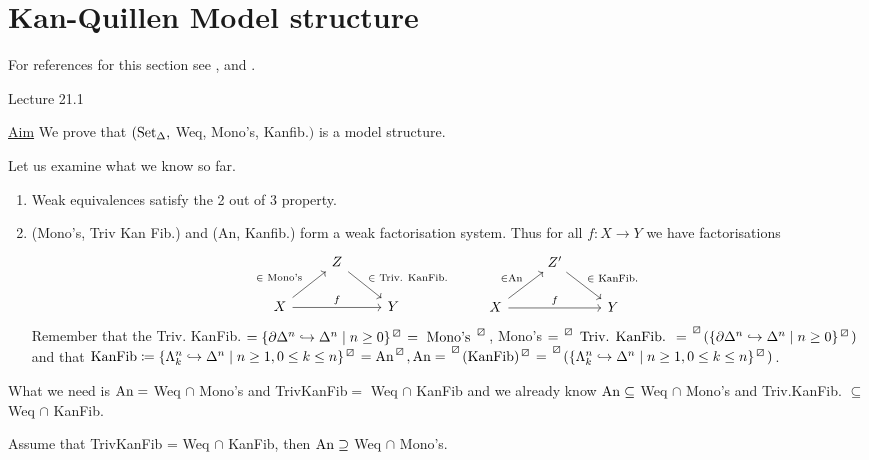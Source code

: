 \section{Kan-Quillen Model structure}

For references for this section see \cite[Section 2.2]{Cisinski_2019}, \cite[Section I.9]{GoerSimp1999} and \cite{Model_category_Hovey}.

Lecture 21.1

\underline{Aim} We prove that $(\operatorname{Set}_{\Delta},$ Weq, Mono's, Kanfib.$)$ is a model structure.

Let us examine what we know so far.
\begin{enumerate}
    \item 
    Weak equivalences satisfy the 2 out of 3 property.
    \item 
    (Mono's, Triv Kan Fib.) and (An, Kanfib.) form a weak factorisation system.
    Thus for all $f\colon X \to Y$ we have factorisations
    \[
    \begin{tikzcd}
        &
        Z
        \ar[rd, "\in \text{ Triv. KanFib. }"]
        &
        \\
        X
        \ar[ru, " \in \text{ Mono's }"]
        \ar[rr, "f"]
        &&
        Y
    \end{tikzcd}
    \qquad
    \begin{tikzcd}
        &
        Z'
        \ar[rd, "\in \text{ KanFib. }"]
        &
        \\
        X
        \ar[ru, " \in \An "]
        \ar[rr, "f"]
        &&
        Y
    \end{tikzcd}
    \]
    Remember that the Triv. KanFib. $= \{ \partial\Delta^n \hookrightarrow \Delta^n \mid n \geq 0 \}^{\lift{}}=\text{ Mono's }^{\lift{}}$, Mono's $=\prescript{\lift{}}{}{\text{ Triv. KanFib. }} = \prescript{\lift{}}{}{(\{ \partial\Delta^n \hookrightarrow \Delta^n \mid n \geq 0 \}^{\lift{}})}$ and that $\KanFib\coloneqq \{ \Lambda_k^n \hookrightarrow \Delta^n \mid n \geq 1, 0 \leq k \leq n \}^{\lift{}}= \An^{\lift{}}, \An= \prescript{\lift{}}{}{(\KanFib)^{\lift{}}}= \prescript{\lift{}}{}{(\{ \Lambda_k^n \hookrightarrow \Delta^n \mid n \geq 1, 0 \leq k \leq n\}^{\lift{}})}$.
\end{enumerate}

What we need is $\operatorname{An}=$ Weq $\cap$ Mono's and TrivKanFib$=$ Weq $\cap$ KanFib and we already know $\operatorname{An} \subseteq$ Weq $\cap$ Mono's and Triv.KanFib. $\subseteq$ Weq $\cap$ KanFib.

\begin{prop}
    Assume that TrivKanFib = Weq $\cap$ KanFib, then $\operatorname{An} \supseteq$ Weq $\cap$ Mono's.
\end{prop}

